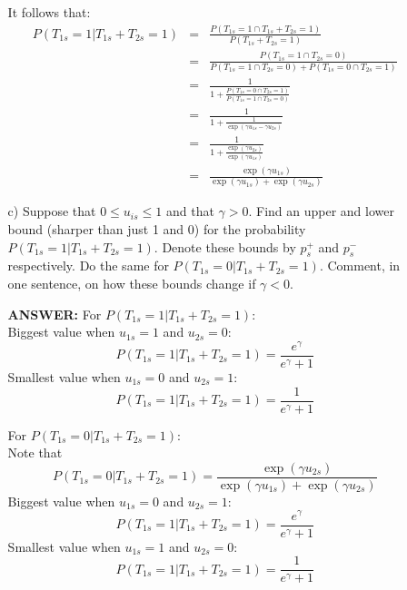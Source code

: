 \documentclass{article}
\begin{document}
\begin{itemize}
\begin{itemize}
          It follows that:
          \begin{eqnarray*}
             P(T_{1s} = 1| T_{1s} + T_{2s} = 1) &=&  
               \frac{P(T_{1s} = 1\cap T_{1s} + T_{2s} = 1) }{P(T_{1s} + T_{2s} = 1)} \\
               &=& \frac{P(T_{1s} = 1\cap T_{2s} = 0) }
                 {P(T_{1s} = 1\cap T_{2s} = 0) + P(T_{1s} = 0\cap T_{2s} = 1)} \\
               &=&\frac{1}{1 +\displaystyle{  \frac{P(T_{1s} = 0 \cap T_{2s} = 1)} 
                 {P(T_{1s} = 1 \cap T_{2s} = 0)}}}\\
               &=& \frac{1}{1 + \displaystyle{\frac{1}{\exp(\gamma u_{1s} - \gamma u_{2s})}}}\\
               &=& \frac{1}{1 + \displaystyle{\frac{\exp(\gamma u_{2s})}{\exp(\gamma u_{1s})}}}\\
               &=& \frac{\exp(\gamma u_{1s})}{\exp(\gamma u_{1s}) + \exp(\gamma u_{2s})}
          \end{eqnarray*}
        \item[c)]
          Suppose that $0 \leq u_{is} \leq 1$ and that $\gamma > 0$.
          Find an upper and lower bound (sharper than just 1 and 0) for the probability
          $P(T_{1s} = 1| T_{1s} + T_{2s} = 1).$
          Denote these bounds by $p^+_s$ and $p^-_s$ respectively.
          Do the same for $P(T_{1s} = 0| T_{1s} + T_{2s} = 1).$
          Comment, in one sentence, on how these bounds change if $\gamma < 0$.
          
          \textbf{ANSWER:}
            For $P(T_{1s} = 1| T_{1s} + T_{2s} = 1)$: \\
            Biggest value when $u_{1s} = 1$ and $u_{2s} = 0$:
            $$
              P(T_{1s} = 1| T_{1s} + T_{2s} = 1) = \frac{e^\gamma}{e^\gamma + 1}
            $$
            Smallest value when $u_{1s} = 0$ and $u_{2s} = 1$:
            $$
              P(T_{1s} = 1| T_{1s} + T_{2s} = 1) = \frac{1}{e^\gamma + 1}
            $$
            
            For $P(T_{1s} = 0| T_{1s} + T_{2s} = 1)$: \\
            Note that 
            $$
               P(T_{1s} = 0| T_{1s} + T_{2s} = 1) 
               =\frac{\exp(\gamma u_{2s})}{\exp(\gamma u_{1s}) + \exp(\gamma u_{2s})}
            $$
            Biggest value when $u_{1s} = 0$ and $u_{2s} = 1$:
            $$
              P(T_{1s} = 1| T_{1s} + T_{2s} = 1) = \frac{e^\gamma}{e^\gamma + 1}
            $$
            Smallest value when $u_{1s} = 1$ and $u_{2s} = 0$:
            $$
              P(T_{1s} = 1| T_{1s} + T_{2s} = 1) = \frac{1}{e^\gamma + 1}
            $$
            

\end{itemize}
\end{itemize}
\end{document}
